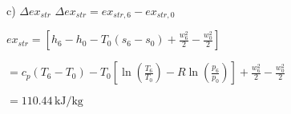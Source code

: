 c) \( \Delta ex_{str} \)  
\( \Delta ex_{str} = ex_{str,6} - ex_{str,0} \)  

\( ex_{str} = \left[ h_6 - h_0 - T_0(s_6 - s_0) + \frac{w_6^2}{2} - \frac{w_0^2}{2} \right] \)  

\( = c_p(T_6 - T_0) - T_0 \left[ \ln \left( \frac{T_6}{T_0} \right) - R \ln \left( \frac{p_6}{p_0} \right) \right] + \frac{w_6^2}{2} - \frac{w_0^2}{2} \)  

\( = 110.44 \, \text{kJ/kg} \)